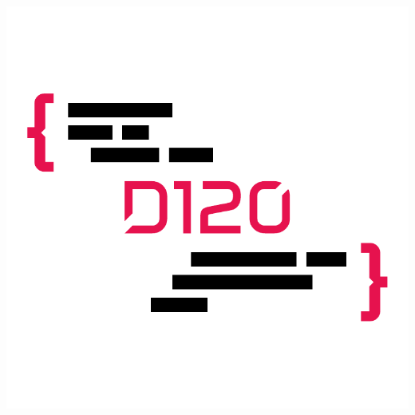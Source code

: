 \begin{frame}
\begin{columns}[b]
\begin{column}{ .4\textwidth }
{            }{
                \includegraphics[width=\textwidth]{../globalMedia/logo.pdf}
            }
        \end{column}
    \end{columns}
\end{frame}

